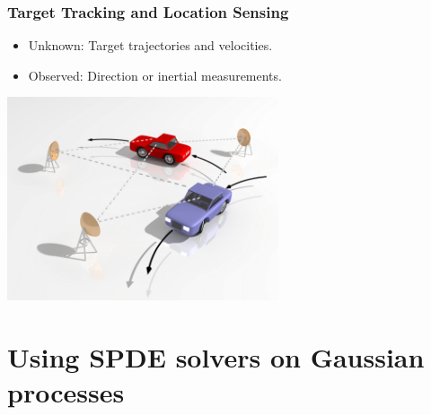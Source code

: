 \documentclass[first=dgreen,second=purple,presentation]{elecslides}
\begin{document}
\begin{frame}
 \frametitle{Target Tracking and Location Sensing}

 \begin{itemize}[<+->]
 \item \alert{Unknown}: Target trajectories and velocities.
 \item \alert{Observed}: Direction or inertial measurements.  
 \end{itemize}
 \begin{center}
 \includegraphics[width=0.6\textwidth]{tracking2-col}
 \end{center}
\end{frame}


\section{Using SPDE solvers on Gaussian processes}
\end{document}
